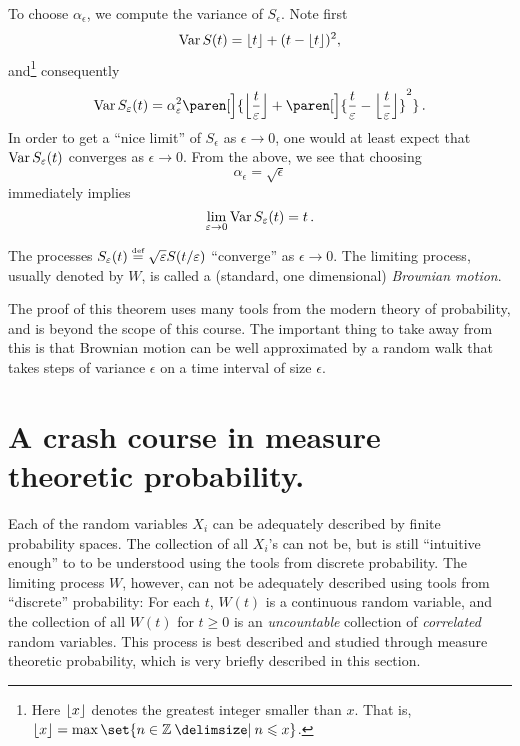 To choose $\alpha_\epsilon$, we compute the variance of $S_\epsilon$.
Note first
\begin{equation*}
  \operatorname{Var} S(t) = \lfloor t\rfloor + (t - \lfloor t\rfloor)^2,
\end{equation*}
and\footnote{%
  Here $\lfloor x\rfloor$ denotes the greatest integer smaller than $x$. That is, $\floor{x} = \max\set{ n \in \Z \st n \leq x }$.
}
consequently
\begin{equation*}
  \var S_\epsilon(t)
    = \alpha_\epsilon^2 \paren[\Big]{
	\floor[\Big]{\frac{t}{\epsilon}}
	+ \paren[\Big]{\frac{t}{\epsilon} - \floor[\Big]{\frac{t}{\epsilon}}}^2
    }\,.
\end{equation*}
In order to get a ``nice limit'' of $S_\epsilon$ as $\epsilon \to 0$, one would at least expect that $\operatorname{Var} S_\varepsilon(t)$ converges as $\epsilon \to 0$.
From the above, we see that choosing
\begin{equation*}
  \alpha_\epsilon = \sqrt{\epsilon}
\end{equation*}
immediately implies
\begin{equation*}
  \lim_{\varepsilon \to 0} \operatorname{Var} S_\varepsilon(t) = t\,.
\end{equation*}

\begin{theorem}\label{t:SRW}
  The processes $S_\varepsilon(t) \stackrel{\scriptscriptstyle\textup{def}}{=} \sqrt{\varepsilon} S( t / \varepsilon )$ ``converge'' as $\epsilon \to 0$.
  The limiting process, usually denoted by $W$, is called a (standard, one dimensional) \emph{Brownian motion}.
\end{theorem}

The proof of this theorem uses many tools from the modern theory of probability, and is beyond the scope of this course.
The important thing to take away from this is that Brownian motion can be well approximated by a random walk that takes steps of variance $\epsilon$ on a time interval of size $\epsilon$.
 

\section{A crash course in measure theoretic probability.}

Each of the random variables $X_i$ can be adequately described by finite probability spaces.
The collection of all $X_i$'s can not be, but is still ``intuitive enough'' to to be understood using the tools from discrete probability.
The limiting process $W$, however, can not be adequately described using tools from ``discrete'' probability: For each $t$, $W(t)$ is a continuous random variable, and the collection of all $W(t)$ for $t \geq 0$ is an \emph{uncountable} collection of \emph{correlated} random variables.
This process is best described and studied through measure theoretic probability, which is very briefly described in this section.

